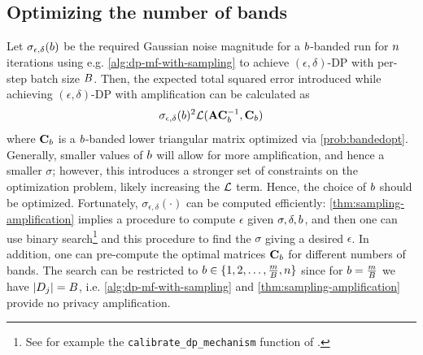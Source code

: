 \documentclass{article}
\begin{document}
\subsection{Optimizing the number of bands}\label{sec:optimizingbands}
Let $\sigma_{\epsilon, \delta}(b)$ 
be the required Gaussian noise magnitude for a $b$-banded \MF run for $n$ iterations using e.g. \cref{alg:dp-mf-with-sampling} to achieve $(\epsilon, \delta)$-DP with per-step batch size $B$. 
Then, the expected total squared error introduced while achieving $(\epsilon, \delta)$-DP with amplification can be calculated as 
\begin{equation*}
\sigma_{\epsilon, \delta}(b)^2 \mathcal{L}(\mathbf{A} \mathbf{C}_{b}^{-1}, \mathbf{C}_
{b})
\end{equation*}
where $\mathbf{C}_{b}$ is a $b$-banded lower triangular matrix optimized via \cref{prob:bandedopt}. Generally, smaller values of $b$ will allow for more amplification, and hence a smaller $\sigma$; however, this introduces a stronger set of constraints on the optimization problem, likely increasing the $\mathcal{L}$ term. Hence, the choice of $b$ should be optimized. Fortunately, $\sigma_{\epsilon, \delta}(\cdot)$ can be computed efficiently: \cref{thm:sampling-amplification} implies a procedure to compute $\epsilon$ given $\sigma, \delta, b$, and then one can use binary search\footnote{See for example the \texttt{calibrate\_dp\_mechanism} function of \citet{pldlib}.} and this procedure to find the $\sigma$ giving a desired $\epsilon$. In addition, one can pre-compute the optimal matrices $\mathbf{C}_{b}$ for different numbers of bands. 
The search can be restricted to $b \in \{1, 2, \dots, \frac{m}{B}, n \}$ since for $b = \frac{m}{B}$ we have $|D_j| = B$, i.e. \cref{alg:dp-mf-with-sampling} and \cref{thm:sampling-amplification} provide no privacy amplification.  
\end{document}
